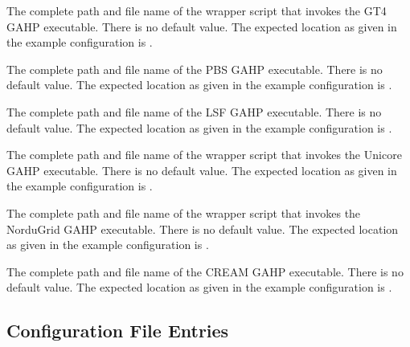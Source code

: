 \begin{description}
\label{param:GT4GAHP}
\item[\Macro{GT4\_GAHP}]
  The complete path and file name of the
  wrapper script that invokes the GT4 GAHP executable.
  There is no default value. The expected location as given
  in the example configuration is .

\label{param:PBSGAHP}
\item[\Macro{PBS\_GAHP}]
  The complete path and file name of the PBS GAHP executable.
  There is no default value.
  The expected location as given in the example configuration is
  .

\label{param:LSFGAHP}
\item[\Macro{LSF\_GAHP}]
  The complete path and file name of the LSF GAHP executable.
  There is no default value.
  The expected location as given in the example configuration is
  .

\label{param:UnicoreGAHP}
\item[\Macro{UNICORE\_GAHP}]
  The complete path and file name of the
  wrapper script that invokes the Unicore GAHP executable.
  There is no default value. The expected location as given
  in the example configuration is .

\label{param:NorduGridGAHP}
\item[\Macro{NORDUGRID\_GAHP}]
  The complete path and file name of the
  wrapper script that invokes the NorduGrid GAHP executable.
  There is no default value. The expected location as given
  in the example configuration is .

\label{param:CREAMGAHP}
\item[\Macro{CREAM\_GAHP}]
  The complete path and file name of the CREAM GAHP executable.
  There is no default value.
  The expected location as given in the example configuration is
  .

\end{description}

\subsection{\label{sec:JobRouter-Config-File-Entries}
Configuration File Entries}

